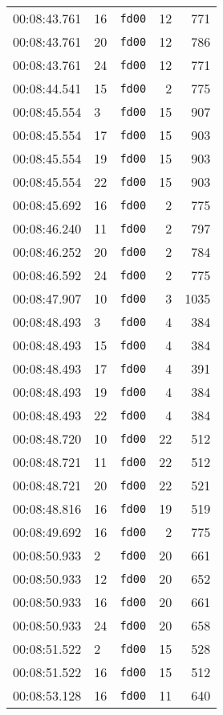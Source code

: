 \documentclass{article}
\begin{document}
\begin{longtable}{lllrr}
00:08:43.761 & 16 & \texttt{fd00} & 12 & 771 \\
00:08:43.761 & 20 & \texttt{fd00} & 12 & 786 \\
00:08:43.761 & 24 & \texttt{fd00} & 12 & 771 \\
00:08:44.541 & 15 & \texttt{fd00} & 2 & 775 \\
00:08:45.554 & 3 & \texttt{fd00} & 15 & 907 \\
00:08:45.554 & 17 & \texttt{fd00} & 15 & 903 \\
00:08:45.554 & 19 & \texttt{fd00} & 15 & 903 \\
00:08:45.554 & 22 & \texttt{fd00} & 15 & 903 \\
00:08:45.692 & 16 & \texttt{fd00} & 2 & 775 \\
00:08:46.240 & 11 & \texttt{fd00} & 2 & 797 \\
00:08:46.252 & 20 & \texttt{fd00} & 2 & 784 \\
00:08:46.592 & 24 & \texttt{fd00} & 2 & 775 \\
00:08:47.907 & 10 & \texttt{fd00} & 3 & 1035 \\
00:08:48.493 & 3 & \texttt{fd00} & 4 & 384 \\
00:08:48.493 & 15 & \texttt{fd00} & 4 & 384 \\
00:08:48.493 & 17 & \texttt{fd00} & 4 & 391 \\
00:08:48.493 & 19 & \texttt{fd00} & 4 & 384 \\
00:08:48.493 & 22 & \texttt{fd00} & 4 & 384 \\
00:08:48.720 & 10 & \texttt{fd00} & 22 & 512 \\
00:08:48.721 & 11 & \texttt{fd00} & 22 & 512 \\
00:08:48.721 & 20 & \texttt{fd00} & 22 & 521 \\
00:08:48.816 & 16 & \texttt{fd00} & 19 & 519 \\
00:08:49.692 & 16 & \texttt{fd00} & 2 & 775 \\
00:08:50.933 & 2 & \texttt{fd00} & 20 & 661 \\
00:08:50.933 & 12 & \texttt{fd00} & 20 & 652 \\
00:08:50.933 & 16 & \texttt{fd00} & 20 & 661 \\
00:08:50.933 & 24 & \texttt{fd00} & 20 & 658 \\
00:08:51.522 & 2 & \texttt{fd00} & 15 & 528 \\
00:08:51.522 & 16 & \texttt{fd00} & 15 & 512 \\
00:08:53.128 & 16 & \texttt{fd00} & 11 & 640 \\

\end{longtable}
\end{document}
